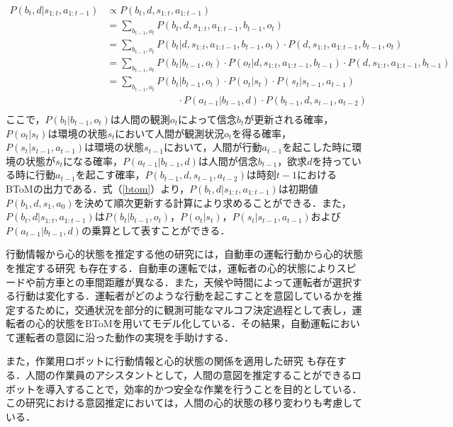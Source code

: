 \begin{equation}
  \begin{split}
  \label{btom}
  P(b_t,d|s_{1:t},a_{1:t-1}) &\propto P(b_t,d,s_{1:t},a_{1:t-1})\\
  &= \sum_{b_{t-1},o_t}P(b_t,d,s_{1:t},a_{1:t-1},b_{t-1},o_t)\\
  &= \sum_{b_{t-1},o_t}P(b_t|d,s_{1:t},a_{1:t-1},b_{t-1},o_t)\cdot P(d,s_{1:t},a_{1:t-1},b_{t-1},o_t)\\
  &= \sum_{b_{t-1},o_t}P(b_t|b_{t-1},o_t)\cdot P(o_t|d,s_{1:t},a_{1:t-1},b_{t-1})\cdot P(d,s_{1:t},a_{1:t-1},b_{t-1})\\
  &= \sum_{b_{t-1},o_t}P(b_t|b_{t-1},o_t)\cdot P(o_t|s_t)\cdot P(s_t|s_{t-1},a_{t-1})\\
  &\hspace{3cm} \cdot P(a_{t-1}|b_{t-1},d)\cdot P(b_{t-1},d,s_{t-1},a_{t-2})\\
  \end{split}
\end{equation}
ここで，$P(b_t|b_{t-1},o_t)$は人間の観測$o_t$によって信念$b_t$が更新される確率，$P(o_t|s_t)$は環境の状態$s_t$において人間が観測状況$o_t$を得る確率，$P(s_t|s_{t-1},a_{t-1})$は環境の状態$s_{t-1}$において，人間が行動$a_{t-1}$を起こした時に環境の状態が$s_t$になる確率，$P(a_{t-1}|b_{t-1},d)$は人間が信念$b_{t-1}$，欲求$d$を持っている時に行動$a_{t-1}$を起こす確率，$P(b_{t-1},d,s_{t-1},a_{t-2})$は時刻$t-1$におけるBToMの出力である．式（\ref{btom}）より，$P(b_t,d|s_{1:t},a_{1:t-1})$は初期値$P(b_1,d,s_1,a_0)$を決めて順次更新する計算により求めることができる．また，$P(b_t,d|s_{1:t},a_{1:t-1})$は$P(b_t|b_{t-1},o_t)$，$P(o_t|s_t)$，$P(s_t|s_{t-1},a_{t-1})$および$P(a_{t-1}|b_{t-1},d)$の乗算として表すことができる．


\par
行動情報から心的状態を推定する他の研究には，自動車の運転行動から心的状態を推定する研究 \cite{darwish2020learning}も存在する．自動車の運転では，運転者の心的状態によりスピードや前方車との車間距離が異なる．また，天候や時間によって運転者が選択する行動は変化する．運転者がどのような行動を起こすことを意図しているかを推定するために，交通状況を部分的に観測可能なマルコフ決定過程として表し，運転者の心的状態をBToMを用いてモデル化している．その結果，自動運転において運転者の意図に沿った動作の実現を手助けする．

\par
また，作業用ロボットに行動情報と心的状態の関係を適用した研究 \cite{inbook}も存在する．人間の作業員のアシスタントとして，人間の意図を推定することができるロボットを導入することで，効率的かつ安全な作業を行うことを目的としている．この研究における意図推定においては，人間の心的状態の移り変わりも考慮している．

